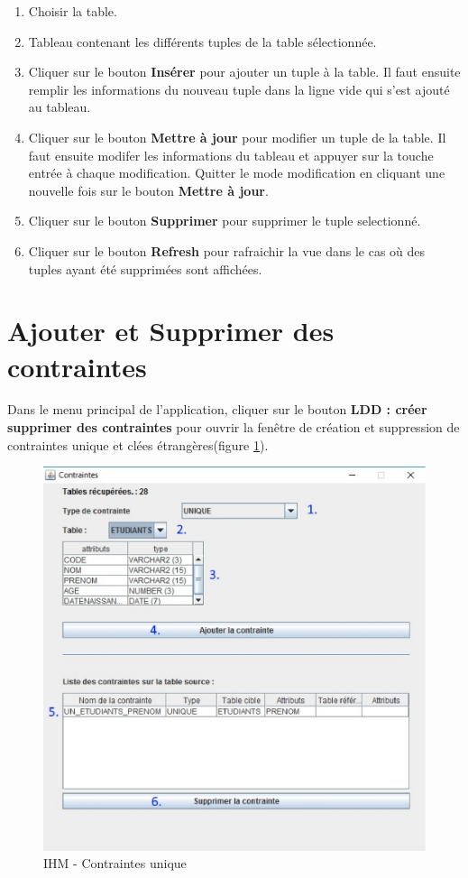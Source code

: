 \begin{enumerate}
\item Choisir la table.
\item Tableau contenant les différents tuples de la table sélectionnée.
\item Cliquer sur le bouton \textbf{Insérer} pour ajouter un tuple à la table. Il faut ensuite remplir les informations du nouveau tuple
dans la ligne vide qui s'est ajouté au tableau.
\item Cliquer sur le bouton \textbf{Mettre à jour} pour modifier un tuple de la table. Il faut ensuite modifer les informations du tableau et 
appuyer sur la touche entrée à chaque modification. Quitter le mode modification en cliquant une nouvelle fois sur le bouton \textbf{Mettre à jour}.
\item Cliquer sur le bouton \textbf{Supprimer} pour supprimer le tuple selectionné.
\item Cliquer sur le bouton \textbf{Refresh} pour rafraichir la vue dans le cas où des tuples ayant été supprimées sont affichées.
\end{enumerate}

\section{Ajouter et Supprimer des contraintes}

Dans le menu principal de l'application, cliquer sur le bouton \textbf{LDD : créer supprimer des contraintes} pour ouvrir la fen\^etre de création et suppression de contraintes unique et clées étrangères(figure \ref{contraintes_unique_gui}).

\begin{figure}[!h]
\centering
\includegraphics[width=12cm]{./images/manuel/contraintes_unique.eps}
\caption{IHM - Contraintes unique}
\label{contraintes_unique_gui}
\end{figure}

